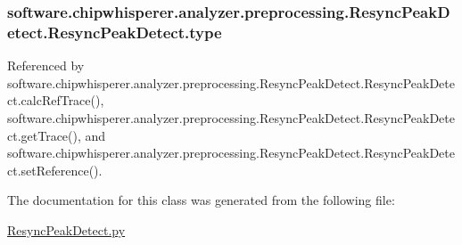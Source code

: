 \subsubsection[{type}]{\setlength{\rightskip}{0pt plus 5cm}software.\+chipwhisperer.\+analyzer.\+preprocessing.\+Resync\+Peak\+Detect.\+Resync\+Peak\+Detect.\+type}\label{classsoftware_1_1chipwhisperer_1_1analyzer_1_1preprocessing_1_1ResyncPeakDetect_1_1ResyncPeakDetect_a3b7dd046990d2201be9e6e2790a18d5f}


Referenced by software.\+chipwhisperer.\+analyzer.\+preprocessing.\+Resync\+Peak\+Detect.\+Resync\+Peak\+Detect.\+calc\+Ref\+Trace(), software.\+chipwhisperer.\+analyzer.\+preprocessing.\+Resync\+Peak\+Detect.\+Resync\+Peak\+Detect.\+get\+Trace(), and software.\+chipwhisperer.\+analyzer.\+preprocessing.\+Resync\+Peak\+Detect.\+Resync\+Peak\+Detect.\+set\+Reference().



The documentation for this class was generated from the following file\+:\begin{DoxyCompactItemize}
\item 
\hyperlink{ResyncPeakDetect_8py}{Resync\+Peak\+Detect.\+py}\end{DoxyCompactItemize}
